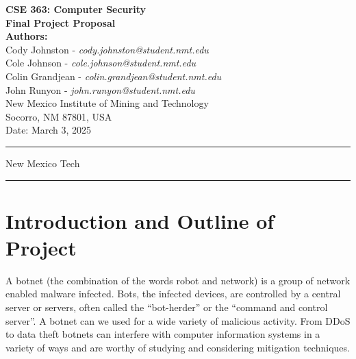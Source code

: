 \documentclass[english,12pt]{article}
\begin{document}
\begin{titlepage}
    \null
    \vspace*{2cm}
    
    \begin{center}
        {\Huge \bfseries CSE 363: Computer Security}\\[1.5cm]
        {\Large \bfseries Final Project Proposal}\\[2cm]
        
        \textbf{Authors:} \\[0.5cm]
        Cody Johnston - \textit{cody.johnston@student.nmt.edu}\\
        Cole Johnson - \textit{cole.johnson@student.nmt.edu}\\
        Colin Grandjean - \textit{colin.grandjean@student.nmt.edu}\\
        John Runyon - \textit{john.runyon@student.nmt.edu}\\
        
        New Mexico Institute of Mining and Technology\\
        Socorro, NM 87801, USA\\[2cm]
        
        {\large Date: March 3, 2025}
    \end{center}
    
    \vfill
    \hrule
    \smallskip
    \centerline{\sc New Mexico Tech}
    \smallskip
    \hrule
\end{titlepage}
\frenchspacing
\pagebreak
\section*{Introduction and Outline of Project}
A botnet (the combination of the words robot and network) is a group of network 
enabled malware infected. Bots, the infected devices, 
are controlled by a central server or servers, 
often called the “bot-herder” or the “command and control server”. A botnet
can we used for a wide variety of malicious activity. From DDoS to data theft
botnets can interfere with computer information systems in a variety of ways
and are worthy of studying and considering mitigation techniques.
\end{document}
